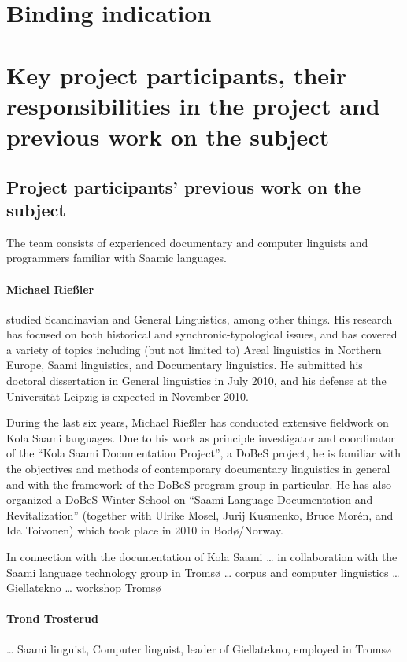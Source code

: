 \documentclass[a4paper,12pt]{article}
\begin{document}
\section{Binding indication}

\section{Key project participants, their responsibilities in the project and previous work on the subject}

\subsection{Project participants' previous work on the subject}
The team consists of experienced documentary and computer linguists and programmers familiar with Saamic languages.

\paragraph{Michael Rießler} studied Scandinavian and General Linguistics, among other things. His research has focused on both historical and synchronic-typological issues, and has covered a variety of topics including (but not limited to) Areal linguistics in Northern Europe, Saami linguistics, and Documentary linguistics. He submitted his doctoral dissertation in General linguistics in July 2010, and his defense at the Universität Leipzig is expected in November 2010.

During the last six years, Michael Rießler has conducted extensive fieldwork on Kola Saami languages. Due to his work as principle investigator and coordinator of the “Kola Saami Documentation Project”, a DoBeS project, he is familiar with the objectives and methods of contemporary documentary linguistics in general and with the framework of the DoBeS program group in particular. He has also organized a DoBeS Winter School on “Saami Language Documentation and Revitalization” (together with Ulrike Mosel, Jurij Kusmenko, Bruce Morén, and Ida Toivonen) which took place in 2010 in Bodø/Norway.

In connection with the documentation of Kola Saami … in collaboration with the Saami language technology group in Tromsø … corpus and computer linguistics … Giellatekno … workshop Tromsø

\paragraph{Trond Trosterud} … Saami linguist, Computer linguist, leader of Giellatekno, employed in Tromsø
\end{document}
